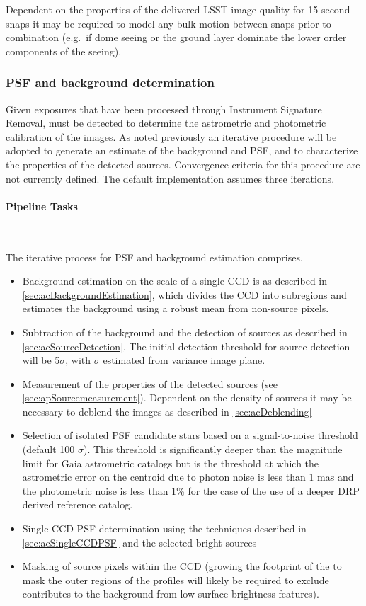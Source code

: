 Dependent on the properties of the delivered LSST image quality for 15 second snaps it may be required to model any bulk motion between snaps prior to combination (e.g.\ if dome seeing or the ground layer dominate the lower order components of the seeing).


\subsubsection{PSF and background determination}
\label{sec:apPSFBackground}

Given exposures that have been processed through Instrument Signature Removal, \Sources must be detected to determine the astrometric and photometric calibration of the images. As noted previously an iterative procedure will be adopted to generate an estimate of the background and PSF, and to characterize the properties of the detected sources.  Convergence criteria for this procedure are not currently defined. The default implementation assumes three iterations.

\paragraph{Pipeline Tasks}~

The iterative process for PSF and background estimation comprises,
\begin{itemize}
\item Background estimation on the scale of a single CCD is as described in \ref{sec:acBackgroundEstimation}, which divides the CCD into subregions and estimates the background using a robust mean from non-source pixels.
\item Subtraction of the background and the detection of sources as described in \ref{sec:acSourceDetection}. The initial detection threshold for source detection will be 5$\sigma$, with $\sigma$ estimated from variance image plane.
\item Measurement of the properties of the detected sources (see \ref{sec:apSourcemeasurement}). Dependent on the density of sources it may be necessary to deblend the images as described in \ref{sec:acDeblending}
\item Selection of isolated PSF candidate stars based on a signal-to-noise threshold (default 100 $\sigma$). This threshold is significantly deeper than the magnitude limit for Gaia astrometric catalogs but is the threshold at which the astrometric error on the centroid due to photon noise is less than 1 mas and the photometric noise is less than 1\% for the case of the use of a deeper DRP derived reference catalog.
\item Single CCD PSF determination using the techniques described in \ref{sec:acSingleCCDPSF} and the selected bright sources 
\item Masking of source pixels within the CCD (growing the footprint of the \Sources to mask the outer regions of the \Source profiles will likely be required to exclude contributes to the background from low surface brightness features).
\end{itemize}

